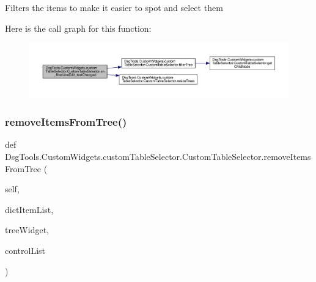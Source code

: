 \begin{DoxyVerb}Filters the items to make it easier to spot and select them
\end{DoxyVerb}
 Here is the call graph for this function\+:
\nopagebreak
\begin{figure}[H]
\begin{center}
\leavevmode
\includegraphics[width=350pt]{class_dsg_tools_1_1_custom_widgets_1_1custom_table_selector_1_1_custom_table_selector_a2990b2a9df0c5cf1e77c928be02e01c8_cgraph}
\end{center}
\end{figure}
\mbox{\label{class_dsg_tools_1_1_custom_widgets_1_1custom_table_selector_1_1_custom_table_selector_ae65f65b45d6ed93537e89c028313aef5}} 
\subsubsection{\texorpdfstring{remove\+Items\+From\+Tree()}{removeItemsFromTree()}}
{\footnotesize\ttfamily def Dsg\+Tools.\+Custom\+Widgets.\+custom\+Table\+Selector.\+Custom\+Table\+Selector.\+remove\+Items\+From\+Tree (\begin{DoxyParamCaption}\item[{}]{self,  }\item[{}]{dict\+Item\+List,  }\item[{}]{tree\+Widget,  }\item[{}]{control\+List }\end{DoxyParamCaption})}

